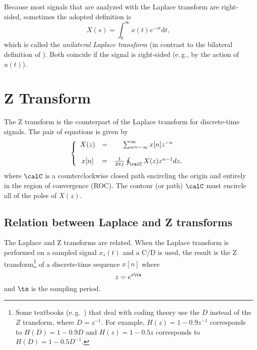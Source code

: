 Because most signals that are analyzed with the Laplace transform are right-sided, sometimes the adopted definition is
\begin{equation}
X(s) = \int_{0}^\infty x(t) e^{-st} \textrm{d}t,
\label{eq:unilateralLaplace}
\end{equation}
which is called the \emph{unilateral Laplace transform} (in contrast to the bilateral definition of ). Both coincide if the signal is right-sided (e.\,g., by the action of $u(t)$).


\section{Z Transform}

The Z transform is the counterpart of the Laplace transform for discrete-time signals. The pair of equations is given by
\begin{equation}
\left\{
\begin{array}{ccc}
X(z) & = & \sum_{n=-\infty}^\infty x[n] z^{-n} \\
& & \\
x[n] & = & \frac{1}{2 \pi j} \oint_{\calC} X(z) z^{n-1} dz,
\\ \end{array}
\right.
\label{eq:z_transform_pair}
\end{equation}
where $\calC$  is a counterclockwise closed path encircling the origin and entirely in the region of convergence (ROC). The contour (or path) $\calC$ must encircle all of the poles of $X(z)$.


\subsection{Relation between Laplace and Z transforms}

The Laplace and Z transforms are related.
When the Laplace transform is performed on a sampled signal $x_s(t)$ and a C/D is used, the result is the Z transform\footnote{
Some textbooks (e.\,g.~\cite{Ciofficn})
that deal with coding theory use the $D$ instead of the $Z$ transform, where $D=z^{-1}$. For example, $H(z)=1-0.9z^{-1}$ corresponds to $H(D)=1-0.9D$ and $H(z)=1-0.5z$ corresponds to $H(D)=1-0.5D^{-1}$.}
of a discrete-time sequence $x[n]$ where
\begin{equation}
z=e^{s \ts}
\label{eq:relating_s_z}
\end{equation}
and $\ts$ is the sampling period.

